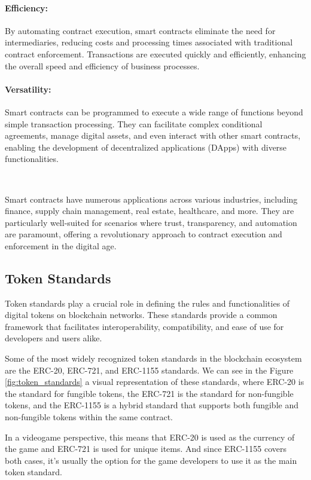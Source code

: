 \paragraph{Efficiency:}
By automating contract execution, smart contracts eliminate the need for intermediaries, reducing costs and processing times associated with traditional contract enforcement. Transactions are executed quickly and efficiently, enhancing the overall speed and efficiency of business processes.

\paragraph{Versatility:}
Smart contracts can be programmed to execute a wide range of functions beyond simple transaction processing. They can facilitate complex conditional agreements, manage digital assets, and even interact with other smart contracts, enabling the development of decentralized applications (DApps) with diverse functionalities.

~

Smart contracts have numerous applications across various industries, including finance, supply chain management, real estate, healthcare, and more. They are particularly well-suited for scenarios where trust, transparency, and automation are paramount, offering a revolutionary approach to contract execution and enforcement in the digital age.

\subsection{Token Standards}
\label{subsec:token_standards}

Token standards play a crucial role in defining the rules and functionalities of digital tokens on blockchain networks. These standards provide a common framework that facilitates interoperability, compatibility, and ease of use for developers and users alike.

Some of the most widely recognized token standards in the blockchain ecosystem are the ERC-20, ERC-721, and ERC-1155 standards. We can see in the Figure \ref{fig:token_standards} a visual representation of these standards, where ERC-20 is the standard for fungible tokens, the ERC-721 is the standard for non-fungible tokens, and the ERC-1155 is a hybrid standard that supports both fungible and non-fungible tokens within the same contract.

In a videogame perspective, this means that ERC-20 is used as the currency of the game and ERC-721 is used for unique items. And since ERC-1155 covers both cases, it's usually the option for the game developers to use it as the main token standard.

